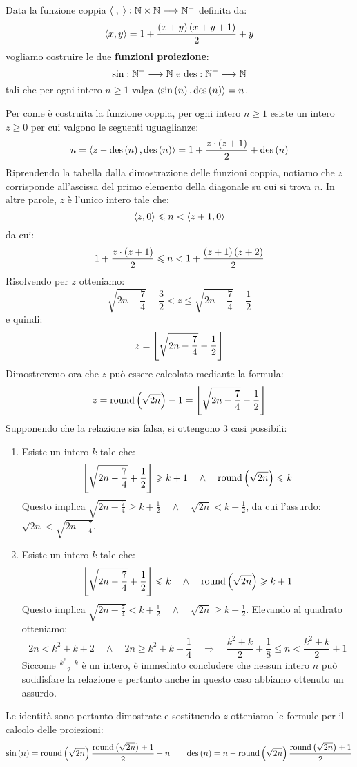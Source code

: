 \documentclass{lectures}
\begin{document}
\begin{corollary}
    Data la funzione coppia \(\left\langle\;,\;\right\rangle:\mathbb{N}\times\mathbb{N}\longrightarrow \mathbb{N}^{+}\) definita da:
    \[
        \left\langle x,y\right\rangle = 1 + \frac{\left(x+y\right)\left(x+y+1\right)}{2} + y
    \]
    vogliamo costruire le due \textbf{funzioni proiezione}:
    \[
        \text{sin}:\mathbb{N}^{+}\longrightarrow \mathbb{N} \text{ e } \text{des}:\mathbb{N}^{+}\longrightarrow \mathbb{N}
    \]
    tali che per ogni intero \(n\geq 1\) valga \(\left\langle\text{sin}\left(n\right), \text{des}\left(n\right)\right\rangle = n\).
    
    Per come è costruita la funzione coppia, per ogni intero \(n \geq 1\) esiste un intero \(z \geq 0\) per cui valgono le seguenti uguaglianze:
    \[
        n = \left\langle z-\text{des}\left(n\right), \text{des}\left(n\right)\right\rangle = 1 + \frac{z\cdot\left(z+1\right)}{2} + \text{des}\left(n\right)
    \]
    Riprendendo la tabella dalla dimostrazione delle funzioni coppia, notiamo che \(z\) corrisponde all'ascissa del primo elemento della diagonale su cui si trova \(n\). In altre parole, \(z\) è l'unico intero tale che:
    \[
        \left\langle z,0\right\rangle \leqslant n < \left\langle z+1, 0\right\rangle
    \]
    da cui:
    \[
        1+\frac{z\cdot\left(z+1\right)}{2}\leqslant n < 1 + \frac{\left(z+1\right)\left(z+2\right)}{2}
    \]
    Risolvendo per \(z\) otteniamo:
    \[
        \sqrt{2n-\frac{7}{4}} - \frac{3}{2} < z \leq \sqrt{2n - \frac{7}{4}} - \frac{1}{2}
    \]
    e quindi:
    \[
        z = \left\lfloor\sqrt{2n-\frac{7}{4}} - \frac{1}{2}\right\rfloor
    \]
    Dimostreremo ora che \(z\) può essere calcolato mediante la formula:
    \[
        z = \text{round}\left(\sqrt{2n}\right)-1 = \left\lfloor\sqrt{2n-\frac{7}{4}} - \frac{1}{2}\right\rfloor
    \]
    Supponendo che la relazione sia falsa, si ottengono 3 casi possibili:
    \begin{enumerate}
        \item Esiste un intero \(k\) tale che:
        \[
            \left\lfloor\sqrt{2n-\frac{7}{4}} + \frac{1}{2}\right\rfloor \geqslant k+1 \quad \land \quad \text{round}\left(\sqrt{2n}\right) \leqslant k
        \]
        Questo implica \(\sqrt{2n-\frac{7}{4}} \geq k + \frac{1}{2} \quad \land \quad \sqrt{2n} < k + \frac{1}{2}\), da cui l'assurdo: \(\sqrt{2n} < \sqrt{2n-\frac{7}{4}}\).
        \item Esiste un intero \(k\) tale che:
        \[
            \left\lfloor\sqrt{2n-\frac{7}{4}} + \frac{1}{2}\right\rfloor \leqslant k \quad \land \quad \text{round}\left(\sqrt{2n}\right) \geqslant k+1
        \]
        Questo implica \(\sqrt{2n - \frac{7}{4}}<k + \frac{1}{2} \quad \land \quad \sqrt{2n} \geq k+\frac{1}{2}\). Elevando al quadrato otteniamo:
        \[
            2n < k^2 + k + 2 \quad \land \quad 2n \geq k^2 + k + \frac{1}{4} \quad \Rightarrow \quad \frac{k^2+k}{2} + \frac{1}{8} \leq n < \frac{k^2+k}{2} +1
        \]
        Siccome \(\frac{k^2+k}{2}\) è un intero, è immediato concludere che nessun intero \(n\) può soddisfare la relazione e pertanto anche in questo caso abbiamo ottenuto un assurdo.
    \end{enumerate}
    Le identità sono pertanto dimostrate e sostituendo \(z\) otteniamo le formule per il calcolo delle proiezioni:
    \[
        \text{sin}\left(n\right) = \text{round}\left(\sqrt{2n}\right)\frac{\text{round}\left(\sqrt{2n}\right)+1}{2}-n \quad \quad \text{des}\left(n\right) = n -  \text{round}\left(\sqrt{2n}\right)\frac{\text{round}\left(\sqrt{2n}\right)+1}{2}
    \]
\end{corollary}
\end{document}
